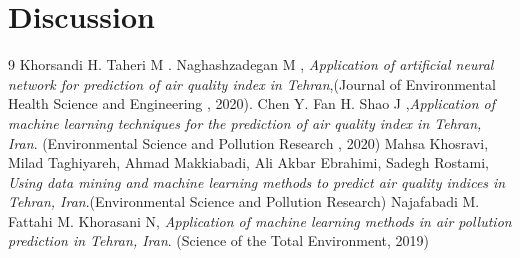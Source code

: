 \documentclass[12pt]{article}
\begin{document}
\section{Discussion}
\begin{thebibliography}{9}
Khorsandi H. Taheri M . Naghashzadegan M , \textit{Application of artificial neural network for prediction of air quality index in Tehran},(Journal of Environmental Health Science and Engineering , 2020).
Chen Y. Fan H.  Shao J ,\textit{Application of machine learning techniques for the prediction of air quality index in Tehran, Iran}. (Environmental Science and Pollution Research , 2020)
Mahsa Khosravi, Milad Taghiyareh, Ahmad Makkiabadi, Ali Akbar Ebrahimi, Sadegh Rostami,\textit{ Using data mining and machine learning methods to predict air quality indices in Tehran, Iran}.(Environmental Science and Pollution Research)
Najafabadi M. Fattahi M. Khorasani N, \textit{Application of machine learning methods in air pollution prediction in Tehran, Iran}. (Science of the Total Environment, 2019)
\end{thebibliography}
\end{document}

